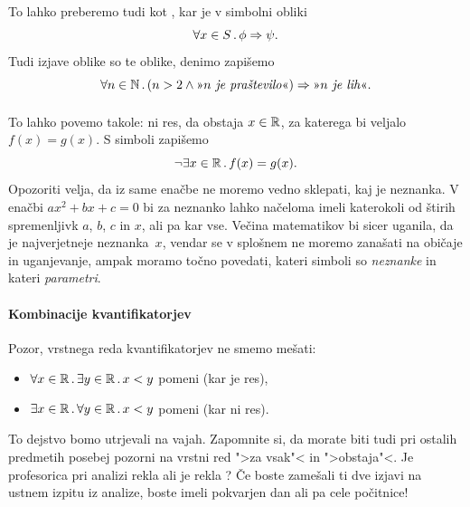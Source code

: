 \paragraph{}
%
To lahko preberemo tudi kot , kar je v simbolni obliki
%
\begin{equation*}
  \forall x \in S \,.\, \phi \Rightarrow \psi.
\end{equation*}
%
Tudi izjave oblike  so te oblike, denimo  zapišemo
%
\begin{equation*}
  \all{n \in \NN} (n > 2 \land \text{\nls{$n$ je praštevilo}}) \lthen \text{\nls{$n$ je lih}}.
\end{equation*}

\paragraph{}
%
To lahko povemo takole: ni res, da obstaja $x \in \mathbb{R}$, za katerega bi
veljalo $f(x) = g(x)$. S simboli zapišemo
%
\begin{equation*}
  \lnot \exists x \in \mathbb{R} \,.\, f(x) = g(x).
\end{equation*}
%
Opozoriti velja, da iz same enačbe ne moremo vedno sklepati, kaj je
neznanka. V enačbi $a x^2 + b x + c = 0$ bi za neznanko lahko načeloma
imeli katerokoli od štirih spremenljivk $a$, $b$, $c$ in $x$, ali pa
kar vse. Večina matematikov bi sicer uganila, da je najverjetneje
neznanka~$x$, vendar se v splošnem ne moremo zanašati na običaje in
uganjevanje, ampak moramo točno povedati, kateri simboli so
\emph{neznanke} in kateri \emph{parametri}.

\paragraph*{Kombinacije kvantifikatorjev}

Pozor, vrstnega reda kvantifikatorjev ne smemo mešati:
%
\begin{itemize}
\item $\forall x \in \mathbb{R} \,.\, \exists y \in \mathbb{R} \,.\, x < y$ pomeni  (kar je res),
\item $\exists x \in \mathbb{R} \,.\, \forall y \in \mathbb{R} \,.\, x < y$ pomeni  (kar ni res).
\end{itemize}
%
To dejstvo bomo utrjevali na vajah. Zapomnite si, da morate biti tudi pri ostalih predmetih posebej pozorni na vrstni red
">za vsak"< in ">obstaja"<. Je profesorica pri analizi rekla  ali je rekla ? Če boste zamešali ti dve izjavi na ustnem izpitu iz analize, boste imeli pokvarjen dan ali pa cele počitnice!


